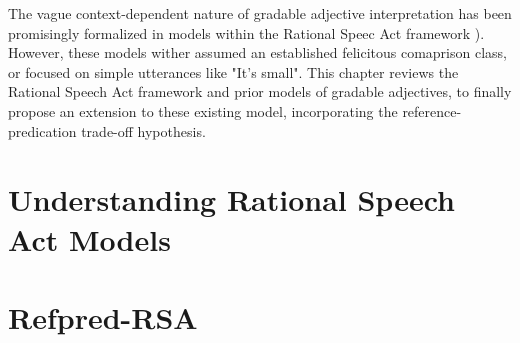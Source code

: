 The vague context-dependent nature of gradable adjective interpretation has been promisingly formalized in models within the Rational Speec Act framework \parencite{goodman2016, lassiter2017adjectival, tessler2017warm}). However, these models wither assumed an established felicitous comaprison class, or focused on simple utterances like "It's small". This chapter reviews the Rational Speech Act framework and prior models of gradable adjectives, to finally propose an extension to these existing model, incorporating the reference-predication trade-off hypothesis.   
\section{Understanding Rational Speech Act Models}
\section{Refpred-RSA}
